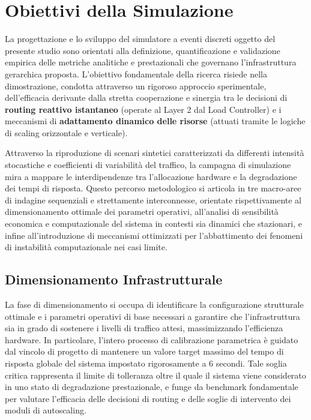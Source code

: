 ﻿\documentclass[a4paper,12pt]{article}
\begin{document}
\clearpage


\section{Obiettivi della Simulazione}
La progettazione e lo sviluppo del simulatore a eventi discreti oggetto del presente studio sono orientati alla definizione, quantificazione e validazione empirica delle metriche analitiche e prestazionali che governano l'infrastruttura gerarchica proposta. L'obiettivo fondamentale della ricerca risiede nella dimostrazione, condotta attraverso un rigoroso approccio sperimentale, dell'efficacia derivante dalla stretta cooperazione e sinergia tra le decisioni di \textbf{routing reattivo istantaneo} (operate al Layer 2 dal Load Controller) e i meccanismi di \textbf{adattamento dinamico delle risorse} (attuati tramite le logiche di scaling orizzontale e verticale). 

Attraverso la riproduzione di scenari sintetici caratterizzati da differenti intensità stocastiche e coefficienti di variabilità del traffico, la campagna di simulazione mira a mappare le interdipendenze tra l'allocazione hardware e la degradazione dei tempi di risposta. Questo percorso metodologico si articola in tre macro-aree di indagine sequenziali e strettamente interconnesse, orientate rispettivamente al dimensionamento ottimale dei parametri operativi, all'analisi di sensibilità economica e computazionale del sistema in contesti sia dinamici che stazionari, e infine all'introduzione di meccanismi ottimizzati per l'abbattimento dei fenomeni di instabilità computazionale nei casi limite.


\subsection{Dimensionamento Infrastrutturale}
La fase di dimensionamento si occupa di identificare la configurazione strutturale ottimale e i parametri operativi di base necessari a garantire che l'infrastruttura sia in grado di sostenere i livelli di traffico attesi, massimizzando l'efficienza hardware. In particolare, l'intero processo di calibrazione parametrica è guidato dal vincolo di progetto di mantenere un valore target massimo del tempo di risposta globale del sistema impostato rigorosamente a 6 secondi. Tale soglia critica rappresenta il limite di tolleranza oltre il quale il sistema viene considerato in uno stato di degradazione prestazionale, e funge da benchmark fondamentale per valutare l'efficacia delle decisioni di routing e delle soglie di intervento dei moduli di autoscaling.
\end{document}
